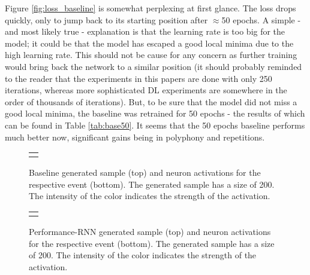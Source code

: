 \documentclass[a4paper]{book}
\begin{document}
Figure \ref{fig:loss_baseline} is somewhat perplexing at first glance. The loss drops quickly, only to jump back to its starting position after $\approx$50 epochs. A simple - and most likely true - explanation is that the learning rate is too big for the model; it could be that the model has escaped a good local minima due to the high learning rate. This should not be cause for any concern as further training would bring back the network to a similar position (it should probably reminded to the reader that the experiments in this papers are done with only 250 iterations, whereas more sophisticated DL experiments are somewhere in the order of thousands of iterations). But, to be sure that the model did not miss a good local minima, the baseline was retrained for 50 epochs - the results of which can be found in Table \ref{tab:base50}. It seems that the 50 epochs baseline performs much better now, significant gains being in polyphony and repetitions.

    \newlength\heatheight
    \newlength\heatwidth
    \setlength\heatheight{9.5cm}
    \setlength\heatwidth{11.5cm}
\begin{figure}
        \begin{tabular}{c}
             \\
             \\
    \end{tabular}
    \caption{Baseline generated sample (top) and neuron activations for the respective event (bottom). The generated sample has a size of 200. The intensity of the color indicates the strength of the activation.}
    \label{fig:baseline_activations}
\end{figure}

\begin{figure}
        \begin{tabular}{c}
             \\
             \\
    \end{tabular}
    \caption{Performance-RNN generated sample (top) and neuron activations for the respective event (bottom). The generated sample has a size of 200. The intensity of the color indicates the strength of the activation.}
    \label{fig:performancernn_activations}
\end{figure}
\end{document}
